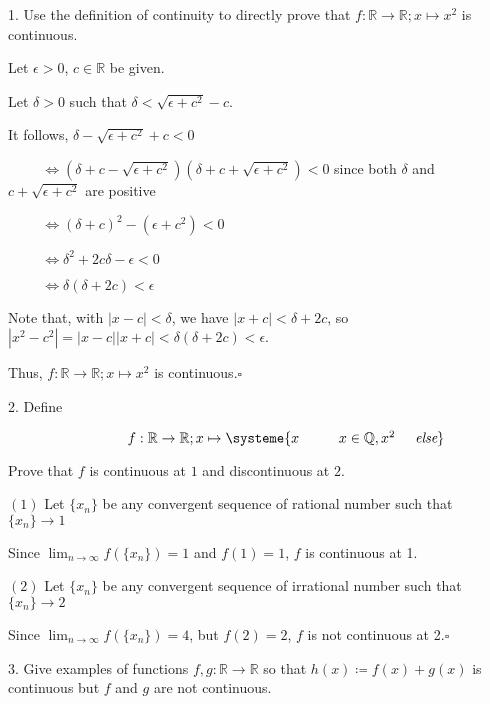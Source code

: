 \documentclass{article}
\begin{document}
1. Use the definition of continuity to directly prove that $f: \mathbb{R} \rightarrow \mathbb{R}; x \mapsto x^2$ is continuous. 

Let $\epsilon > 0$, $c \in \mathbb{R}$ be given. 

Let $\delta > 0$ such that $\delta < \sqrt{\epsilon + c^2}-c$. 

It follows, $\delta - \sqrt{\epsilon+c^2}+c<0$

$\hspace{1cm} \Leftrightarrow(\delta +c-\sqrt{\epsilon +c^2})(\delta+c+\sqrt{\epsilon+c^2})<0$ since both $\delta$ and $ c+\sqrt{\epsilon+c^2}$ are positive

$\hspace{1cm} \Leftrightarrow (\delta+c)^2 - (\epsilon +c^2) < 0$

$\hspace{1cm} \Leftrightarrow \delta^2 + 2c\delta - \epsilon < 0$

$\hspace{1cm} \Leftrightarrow \delta(\delta +2c) < \epsilon$

Note that, with $|x-c|<\delta$, we have $|x+c| < \delta +2c$, so $|x^2-c^2| = |x-c||x+c| < \delta(\delta+2c) < \epsilon$. 

Thus, $f: \mathbb{R} \rightarrow\mathbb{R};x\mapsto x^2$ is continuous.$\square$

2. Define 

$\hspace{3cm} f: \mathbb{R}\rightarrow\mathbb{R}; x\mapsto \systeme{x \hspace{1cm} x \in \mathbb{Q}, x^2 \hspace{.5cm}\textit{else}}$

Prove that $f$ is continuous at $1$ and discontinuous at $2$. 

$(1)$ Let $\{x_n\}$ be any convergent sequence of rational number such that $\{x_n\} \rightarrow 1$

Since $\lim_{n\rightarrow\infty}f(\{x_n\}) = 1$ and $f(1) = 1$, $f$ is continuous at 1. 

$(2)$ Let $\{x_n\}$ be any convergent sequence of irrational number such that $\{x_n\} \rightarrow 2$

Since $\lim_{n\rightarrow\infty}f(\{x_n\}) = 4$, but $f(2) = 2$, $f$ is not continuous at 2.$\square$

3. Give examples of functions $f, g:\mathbb{R} \rightarrow \mathbb{R}$ so that $h(x) \coloneqq f(x)+g(x)$ is continuous but $f$ and $g$ are not continuous.
\end{document}
